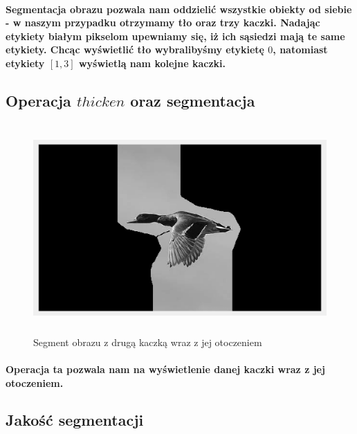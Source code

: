 \documentclass[a4paper,12pt]{article}
\begin{document}
\begin{justify}
\paragraph{Segmentacja obrazu pozwala nam oddzielić wszystkie obiekty od siebie - w naszym przypadku otrzymamy tło oraz trzy kaczki. Nadając etykiety białym pikselom upewniamy się, iż ich sąsiedzi mają te same etykiety. Chcąc wyświetlić tło wybralibyśmy etykietę $0$, natomiast etykiety $[1, 3]$ wyświetlą nam kolejne kaczki.}

\newpage

\subsection{Operacja $thicken$ oraz segmentacja}

\begin{figure}[h]
\centering
\includegraphics[width=12cm, height=8cm]{8}
\caption{Segment obrazu z drugą kaczką wraz z jej otoczeniem}
\end{figure}

\paragraph{Operacja ta pozwala nam na wyświetlenie danej kaczki wraz z jej otoczeniem.}

\subsection{Jakość segmentacji}


\end{justify}
\end{document}
